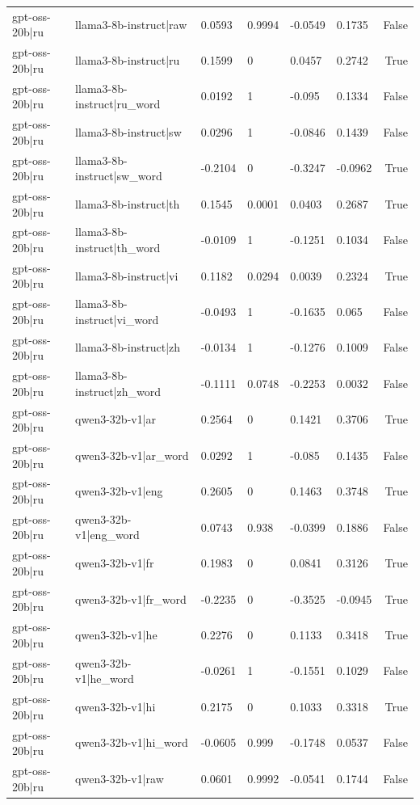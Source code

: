 \begin{table}
\begin{tabular}{llllllr}
gpt-oss-20b|ru & llama3-8b-instruct|raw & 0.0593 & 0.9994 & -0.0549 & 0.1735 & False \\
gpt-oss-20b|ru & llama3-8b-instruct|ru & 0.1599 & 0 & 0.0457 & 0.2742 & True \\
gpt-oss-20b|ru & llama3-8b-instruct|ru_word & 0.0192 & 1 & -0.095 & 0.1334 & False \\
gpt-oss-20b|ru & llama3-8b-instruct|sw & 0.0296 & 1 & -0.0846 & 0.1439 & False \\
gpt-oss-20b|ru & llama3-8b-instruct|sw_word & -0.2104 & 0 & -0.3247 & -0.0962 & True \\
gpt-oss-20b|ru & llama3-8b-instruct|th & 0.1545 & 0.0001 & 0.0403 & 0.2687 & True \\
gpt-oss-20b|ru & llama3-8b-instruct|th_word & -0.0109 & 1 & -0.1251 & 0.1034 & False \\
gpt-oss-20b|ru & llama3-8b-instruct|vi & 0.1182 & 0.0294 & 0.0039 & 0.2324 & True \\
gpt-oss-20b|ru & llama3-8b-instruct|vi_word & -0.0493 & 1 & -0.1635 & 0.065 & False \\
gpt-oss-20b|ru & llama3-8b-instruct|zh & -0.0134 & 1 & -0.1276 & 0.1009 & False \\
gpt-oss-20b|ru & llama3-8b-instruct|zh_word & -0.1111 & 0.0748 & -0.2253 & 0.0032 & False \\
gpt-oss-20b|ru & qwen3-32b-v1|ar & 0.2564 & 0 & 0.1421 & 0.3706 & True \\
gpt-oss-20b|ru & qwen3-32b-v1|ar_word & 0.0292 & 1 & -0.085 & 0.1435 & False \\
gpt-oss-20b|ru & qwen3-32b-v1|eng & 0.2605 & 0 & 0.1463 & 0.3748 & True \\
gpt-oss-20b|ru & qwen3-32b-v1|eng_word & 0.0743 & 0.938 & -0.0399 & 0.1886 & False \\
gpt-oss-20b|ru & qwen3-32b-v1|fr & 0.1983 & 0 & 0.0841 & 0.3126 & True \\
gpt-oss-20b|ru & qwen3-32b-v1|fr_word & -0.2235 & 0 & -0.3525 & -0.0945 & True \\
gpt-oss-20b|ru & qwen3-32b-v1|he & 0.2276 & 0 & 0.1133 & 0.3418 & True \\
gpt-oss-20b|ru & qwen3-32b-v1|he_word & -0.0261 & 1 & -0.1551 & 0.1029 & False \\
gpt-oss-20b|ru & qwen3-32b-v1|hi & 0.2175 & 0 & 0.1033 & 0.3318 & True \\
gpt-oss-20b|ru & qwen3-32b-v1|hi_word & -0.0605 & 0.999 & -0.1748 & 0.0537 & False \\
gpt-oss-20b|ru & qwen3-32b-v1|raw & 0.0601 & 0.9992 & -0.0541 & 0.1744 & False \\

\end{tabular}
\end{table}
